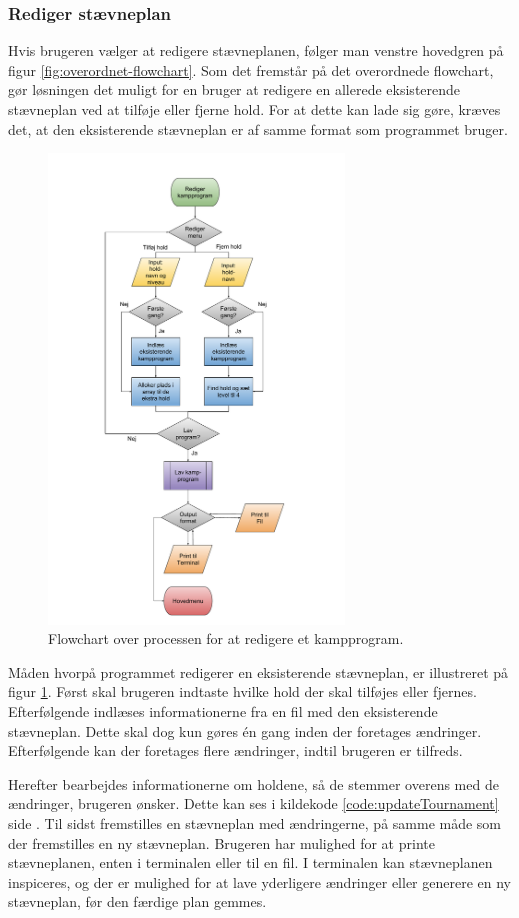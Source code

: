 \subsubsection{Rediger stævneplan}
Hvis brugeren vælger at redigere stævneplanen, følger man venstre hovedgren på figur \ref{fig:overordnet-flowchart}. Som det fremstår på det overordnede flowchart, gør løsningen det muligt for en bruger at redigere en allerede eksisterende stævneplan ved at tilføje eller fjerne hold. For at dette kan lade sig gøre, kræves det, at den eksisterende stævneplan er af samme format som programmet bruger.
\begin{figure}[H]
  \centering
  \includegraphics[width=0.7\textwidth]{figures/Redigerflowchart.pdf}
  \caption{Flowchart over processen for at redigere et kampprogram.}
  \label{fig:rediger-flowchart}
\end{figure}
Måden hvorpå programmet redigerer en eksisterende stævneplan, er illustreret på figur \ref{fig:rediger-flowchart}. Først skal brugeren indtaste hvilke hold der skal tilføjes eller fjernes. Efterfølgende indlæses informationerne fra en fil med den eksisterende stævneplan. Dette skal dog kun gøres én gang inden der foretages ændringer. Efterfølgende kan der foretages flere ændringer, indtil brugeren er tilfreds. 
\par
Herefter bearbejdes informationerne om holdene, så de stemmer overens med de ændringer, brugeren ønsker. Dette kan ses i kildekode \ref{code:updateTournament} side \pageref{code:updateTournament}. Til sidst fremstilles en stævneplan med ændringerne, på samme måde som der fremstilles en ny stævneplan. Brugeren har mulighed for at printe stævneplanen, enten i terminalen eller til en fil. I terminalen kan stævneplanen inspiceres, og der er mulighed for at lave yderligere ændringer eller generere en ny stævneplan, før den færdige plan gemmes.

